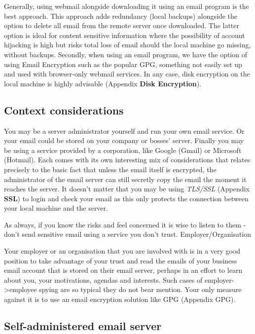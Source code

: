 Generally, using webmail alongside downloading it using an email program
is the best approach. This approach adds redundancy (local backups)
alongside the option to delete all email from the remote server once
downloaded. The latter option is ideal for content sensitive information
where the possibility of account hijacking is high but risks total loss
of email should the local machine go missing, without backups. Secondly,
when using an email program, we have the option of using Email
Encryption such as the popular GPG, something not easily set up and used
with browser-only webmail services. In any case, disk encryption on the
local machine is highly advisable (Appendix \textbf{Disk Encryption}).

\subsection{Context considerations}

You may be a server administrator yourself and run your own email
service. Or your email could be stored on your company or bosses'
server. Finally you may be using a service provided by a corporation,
like Google (Gmail) or Microsoft (Hotmail). Each comes with its own
interesting mix of considerations that relates precisely to the basic
fact that unless the email itself is encrypted, the administrator of the
email server can still secretly copy the email the moment it reaches the
server. It doesn't matter that you may be using \emph{TLS/SSL} (Appendix
\textbf{SSL}) to login and check your email as this only protects the
connection between your local machine and the server.

As always, if you know the risks and feel concerned it is wise to listen
to them - don't send sensitive email using a service you don't trust.
Employer/Organisation

Your employer or an organisation that you are involved with is in a very
good position to take advantage of your trust and read the emails of
your business email account that is stored on their email server,
perhaps in an effort to learn about you, your motivations, agendas and
interests. Such cases of employer-\textgreater{}employee spying are so
typical they do not bear mention. Your only measure against it is to use
an email encryption solution like GPG (Appendix GPG).

\subsection{Self-administered email server}

